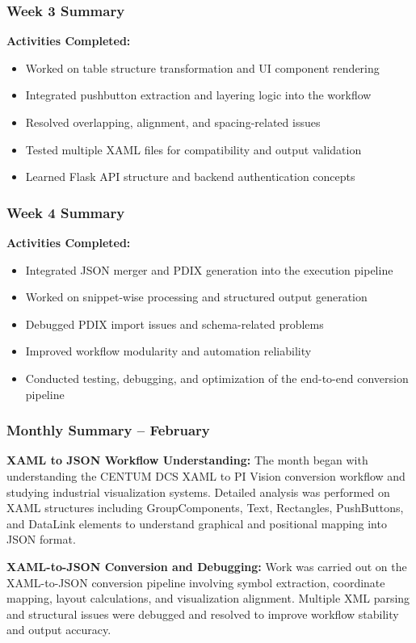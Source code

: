 \documentclass[12pt,a4paper]{report}
\begin{document}
\subsubsection*{Week 3 Summary}
\textbf{Activities Completed:}
\begin{itemize}[leftmargin=1.5cm]
    \item Worked on table structure transformation and UI component rendering
    \item Integrated pushbutton extraction and layering logic into the workflow
    \item Resolved overlapping, alignment, and spacing-related issues
    \item Tested multiple XAML files for compatibility and output validation
    \item Learned Flask API structure and backend authentication concepts
\end{itemize}

\subsubsection*{Week 4 Summary}
\textbf{Activities Completed:}
\begin{itemize}[leftmargin=1.5cm]
    \item Integrated JSON merger and PDIX generation into the execution pipeline
    \item Worked on snippet-wise processing and structured output generation
    \item Debugged PDIX import issues and schema-related problems
    \item Improved workflow modularity and automation reliability
    \item Conducted testing, debugging, and optimization of the end-to-end conversion pipeline
\end{itemize}

\subsubsection*{Monthly Summary -- February}
\textbf{XAML to JSON Workflow Understanding:}
The month began with understanding the CENTUM DCS XAML to PI Vision conversion workflow and studying industrial visualization systems. Detailed analysis was performed on XAML structures including GroupComponents, Text, Rectangles, PushButtons, and DataLink elements to understand graphical and positional mapping into JSON format.

\textbf{XAML-to-JSON Conversion and Debugging:}
Work was carried out on the XAML-to-JSON conversion pipeline involving symbol extraction, coordinate mapping, layout calculations, and visualization alignment. Multiple XML parsing and structural issues were debugged and resolved to improve workflow stability and output accuracy.
\end{document}
